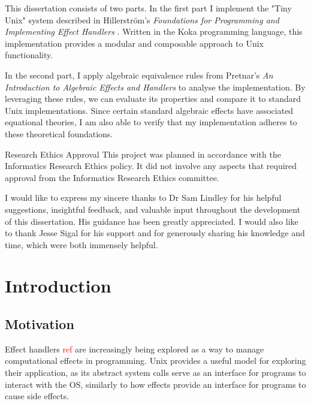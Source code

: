 \documentclass[logo,bsc,singlespacing,parskip]{infthesis}
\begin{document}
\begin{preliminary}
{This dissertation consists of two parts. In the first part I implement the "Tiny Unix" system described in Hillerström’s \textit{Foundations for Programming and Implementing Effect Handlers} \cite{hillerstrom_foundations_nodate}. Written in the Koka programming language, this implementation provides a modular and composable approach to Unix functionality. 

In the second part, I apply algebraic equivalence rules from Pretnar’s \textit{An Introduction to Algebraic Effects and Handlers} \cite{pretnar_introduction_2015} to analyse the implementation. By leveraging these rules, we can evaluate its properties and compare it to standard Unix implementations. Since certain standard algebraic effects have associated equational theories, I am also able to verify that my implementation adheres to these theoretical foundations.
}

\maketitle

\newenvironment{ethics}
   {\begin{frontenv}{Research Ethics Approval}{\LARGE}}
   {\end{frontenv}\newpage}

\begin{ethics}
This project was planned in accordance with the Informatics Research
Ethics policy. It did not involve any aspects that required approval
from the Informatics Research Ethics committee.

\standarddeclaration
\end{ethics}


\begin{acknowledgements}
I would like to express my sincere thanks to Dr Sam Lindley for his helpful suggestions, insightful feedback, and valuable input throughout the development of this dissertation. His guidance has been greatly appreciated. I would also like to thank Jesse Sigal for his support and for generously sharing his knowledge and time, which were both immensely helpful.
\end{acknowledgements}


\tableofcontents
\end{preliminary}


\chapter{Introduction}
\section{Motivation}
Effect handlers \textcolor{red}{ref} are increasingly being explored as a way to manage computational effects in programming. Unix provides a useful model for exploring their application, as its abstract system calls serve as an interface for programs to interact with the OS, similarly to how effects provide an interface for programs to cause side effects. 
\end{document}
